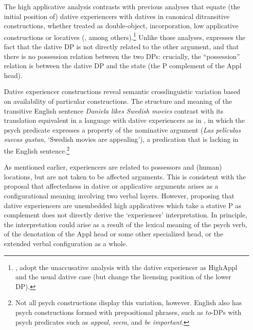 \documentclass[output=paper,colorlinks,citecolor=brown,nonflat]{./langscibook}
\begin{document}







The high applicative analysis contrasts with previous analyses that equate (the initial position of) dative experiencers with datives in canonical ditransitive constructions, whether treated as double-object, incorporation, low applicative constructions or locatives (\citealt{BellettiRizzi1988, Masullo1992thesis}, among others).\footnote{\citealt{Acedo-MatellánMateu2015}, \citealt{Pujalte2015} adopt the unaccusative analysis with the dative experiencer as HighAppl and the usual dative case (but change the licensing position of the lower DP).}   Unlike those analyses,  expresses the fact that the dative DP is not directly related to the other argument, and that there is no possession relation between the two DPs: crucially, the “possession” relation is between the dative DP and the state (the \liv P complement of the Appl head). 

Dative experiencer constructions reveal semantic crosslinguistic variation based on availability of particular constructions. The structure and meaning of the transitive English sentence \textit{Daniela likes Swedish movies} contrast with its translation equivalent in a language with dative experiencers as in , in which the psych predicate expresses a property of the nominative argument (\textit{Las películas suecas gustan}, ‘Swedish movies are appealing’), a predication that is lacking in the English sentence.\footnote{Not all psych constructions display this variation, however. English also has psych constructions formed with prepositional phrases, such as \textit{to}-DPs with psych predicates such as \textit{appeal}, \textit{seem}, and \textit{be important}.} 

As mentioned earlier, experiencers are related to possessors and (human) locations, but are not taken to be affected arguments. This is consistent with the proposal that affectedness in dative or applicative arguments arises as a configurational meaning involving two verbal layers. However, proposing that dative experiencers are unembedded high applicatives which take a stative \liv P as complement does not directly derive the ‘experiencer’ interpretation. In principle, the interpretation could arise as a result of the lexical meaning of the psych verb, of the denotation of the Appl head or some other specialized head, or the extended verbal configuration as a whole. 
\end{document}
